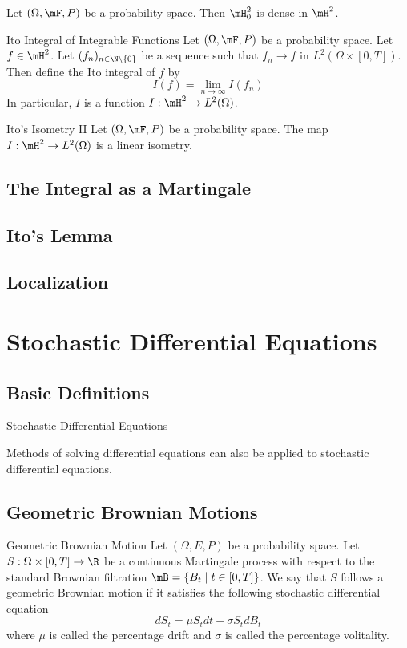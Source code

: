 \documentclass[a4paper]{article}
\begin{document}
\begin{lmm}{}{} Let $(\Omega,\mF,P)$ be a probability space. Then $\mH_0^2$ is dense in $\mH^2$. 
\end{lmm}

\begin{defn}{Ito Integral of Integrable Functions}{} Let $(\Omega,\mF,P)$ be a probability space. Let $f\in\mH^2$. Let $(f_n)_{n\in\N\setminus\{0\}}$ be a sequence such that $f_n\to f$ in $L^2(\Omega\times[0,T])$. Then define the Ito integral of $f$ by $$I(f)=\lim_{n\to\infty}I(f_n)$$ In particular, $I$ is a function $I:\mH^2\to L^2(\Omega)$. 
\end{defn}

\begin{lmm}{Ito's Isometry II}{} Let $(\Omega,\mF,P)$ be a probability space. The map $I:\mH^2\to L^2(\Omega)$ is a linear isometry. 
\end{lmm}

\subsection{The Integral as a Martingale}

\subsection{Ito's Lemma}

\subsection{Localization}

\pagebreak
\section{Stochastic Differential Equations}
\subsection{Basic Definitions}
\begin{defn}{Stochastic Differential Equations}{}
\end{defn}

Methods of solving differential equations can also be applied to stochastic differential equations. 

\subsection{Geometric Brownian Motions}
\begin{defn}{Geometric Brownian Motion}{} Let $(\Omega,E,P)$ be a probability space. Let $S:\Omega\times[0,T]\to\R$ be a continuous Martingale process with respect to the standard Brownian filtration $\mB=\{B_t\;|\;t\in[0,T]\}$. We say that $S$ follows a geometric Brownian motion if it satisfies the following stochastic differential equation $$dS_t=\mu S_tdt+\sigma S_tdB_t$$ where $\mu$ is called the percentage drift and $\sigma$ is called the percentage volitality. 
\end{defn}
\end{document}
